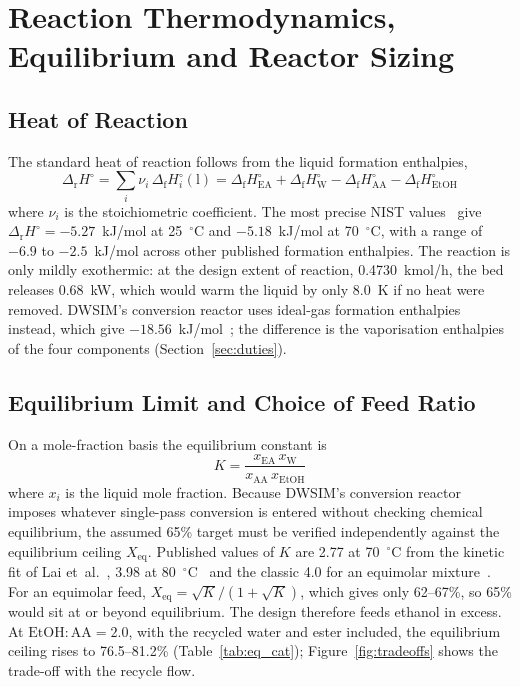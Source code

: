 \documentclass[10pt,a4paper]{article}
\begin{document}
\section{Reaction Thermodynamics, Equilibrium and Reactor Sizing}

\subsection{Heat of Reaction}

The standard heat of reaction follows from the liquid formation enthalpies,
\begin{equation}
\Delta_{\mathrm{r}}H^\circ = \sum_i \nu_i \,\Delta_{\mathrm{f}}H_i^\circ(\mathrm{l}) = \Delta_{\mathrm{f}}H_{\mathrm{EA}}^\circ + \Delta_{\mathrm{f}}H_{\mathrm{W}}^\circ - \Delta_{\mathrm{f}}H_{\mathrm{AA}}^\circ - \Delta_{\mathrm{f}}H_{\mathrm{EtOH}}^\circ
\label{eq:hrxn}
\end{equation}
where $\nu_i$ is the stoichiometric coefficient. The most precise NIST values~\cite{ref5} give $\Delta_{\mathrm{r}}H^\circ = -5.27$~kJ/mol at 25~$^\circ$C and $-5.18$~kJ/mol at 70~$^\circ$C, with a range of $-6.9$ to $-2.5$~kJ/mol across other published formation enthalpies. The reaction is only mildly exothermic: at the design extent of reaction, 0.4730~kmol/h, the bed releases 0.68~kW, which would warm the liquid by only 8.0~K if no heat were removed. DWSIM's conversion reactor uses ideal-gas formation enthalpies instead, which give $-18.56$~kJ/mol~\cite{ref8}; the difference is the vaporisation enthalpies of the four components (Section~\ref{sec:duties}).

\subsection{Equilibrium Limit and Choice of Feed Ratio}
\label{sec:eq_limit}

On a mole-fraction basis the equilibrium constant is
\begin{equation}
K = \frac{x_{\mathrm{EA}}\,x_{\mathrm{W}}}{x_{\mathrm{AA}}\,x_{\mathrm{EtOH}}}
\label{eq:keq}
\end{equation}
where $x_i$ is the liquid mole fraction. Because DWSIM's conversion reactor imposes whatever single-pass conversion is entered without checking chemical equilibrium, the assumed 65\% target must be verified independently against the equilibrium ceiling $X_{\mathrm{eq}}$. Published values of $K$ are 2.77 at 70~$^\circ$C from the kinetic fit of Lai et~al.~\cite{ref7}, 3.98 at 80~$^\circ$C~\cite{ref9} and the classic 4.0 for an equimolar mixture~\cite{ref10}. For an equimolar feed, $X_{\mathrm{eq}} = \sqrt{K}/(1+\sqrt{K})$, which gives only 62--67\%, so 65\% would sit at or beyond equilibrium. The design therefore feeds ethanol in excess. At $\mathrm{EtOH:AA} = 2.0$, with the recycled water and ester included, the equilibrium ceiling rises to 76.5--81.2\% (Table~\ref{tab:eq_cat}); Figure~\ref{fig:tradeoffs} shows the trade-off with the recycle flow.
\end{document}
